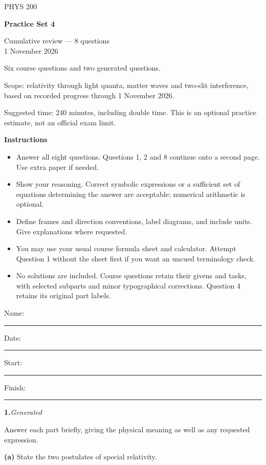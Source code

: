 \documentclass[12pt,letterpaper]{article}
\newcommand{\question}[2]{\noindent\textbf{#1.}\hfill\textit{#2}\par\medskip}
\begin{document}
\begin{titlepage}
\thispagestyle{empty}
\vspace*{0.6in}
{\Large PHYS 200\par}
\vspace{0.25in}
{\LARGE\bfseries Practice Set 4\par}
\vspace{0.2in}
Cumulative review --- 8 questions\\
1 November 2026
\vspace{0.4in}

Six course questions and two generated questions.

Scope: relativity through light quanta, matter waves and two-slit interference, based on recorded progress through 1 November 2026.

Suggested time: 240 minutes, including double time. This is an optional practice estimate, not an official exam limit.

\textbf{Instructions}
\begin{itemize}
\item Answer all eight questions. Questions 1, 2 and 8 continue onto a second page. Use extra paper if needed.
\item Show your reasoning. Correct symbolic expressions or a sufficient set of equations determining the answer are acceptable; numerical arithmetic is optional.
\item Define frames and direction conventions, label diagrams, and include units. Give explanations where requested.
\item You may use your usual course formula sheet and calculator. Attempt Question 1 without the sheet first if you want an uncued terminology check.
\item No solutions are included. Course questions retain their givens and tasks, with selected subparts and minor typographical corrections. Question 4 retains its original part labels.
\end{itemize}
\vfill
Name: \rule{3.5in}{0.4pt}\par
Date: \rule{1.4in}{0.4pt}\hfill Start: \rule{0.8in}{0.4pt}\quad Finish: \rule{0.8in}{0.4pt}
\end{titlepage}
\setcounter{page}{1}


\question{1}{Generated}

Answer each part briefly, giving the physical meaning as well as any requested expression.


\textbf{(a)} State the two postulates of special relativity.
\end{document}
